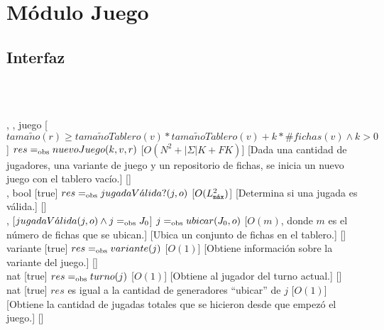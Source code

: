 \section{Módulo Juego}
\begin{interfaz}{\subsection{Interfaz}}
  \\\\
  \par\noindent
  \begin{operaciones}
    {, , }{juego}
    [$tama\tilde{n}o(r)\geq tama\tilde{n}oTablero(v)*tama\tilde{n}oTablero(v)+k*\#fichas(v)\land k>0$]
    {$res \igobs nuevoJuego(k,v,r)$}
    [$O(N^{2}+|\Sigma|K+FK)$]
    [Dada una cantidad de jugadores, una variante de juego y un repositorio de fichas, se inicia un nuevo juego con el tablero vacío.]
    [\falta]\\

    \noindent{}
    {, }{bool}
    [true]
    {$res\igobs jugadaV\acute{a}lida?(j,o)$}
    [$O(\Lmax^{2})$]
    [Determina si una jugada es válida.]
    [\falta]\\

    \noindent{}
    {, }{}
    [$jugadaV\acute{a}lida(j,o) \land j\igobs J_{0} $]
    {$j\igobs ubicar(J_{0},o)$}
    [$O(m)$, donde $m$ es el número de fichas que se ubican.]
    [Ubica un conjunto de fichas en el tablero.]
    [\falta]\\

    \noindent{}
    {}{variante}
    [true]
    {$res\igobs variante(j)$}
    [$O(1)$]
    [Obtiene información sobre la variante del juego.]
    [\falta]\\

    \noindent{}
    {}{nat}
    [true]
    {$res\igobs turno(j)$}
    [$O(1)$]
    [Obtiene al jugador del turno actual.]
    [\falta]\\

    \noindent{}
    {}{nat}
    [true]
    {$res$ es igual a la cantidad de generadores ``ubicar'' de $j$}
    [$O(1)$]
    [Obtiene la cantidad de jugadas totales que se hicieron desde que empezó el juego.]
    [\falta]\\


\end{operaciones}
\end{interfaz}
